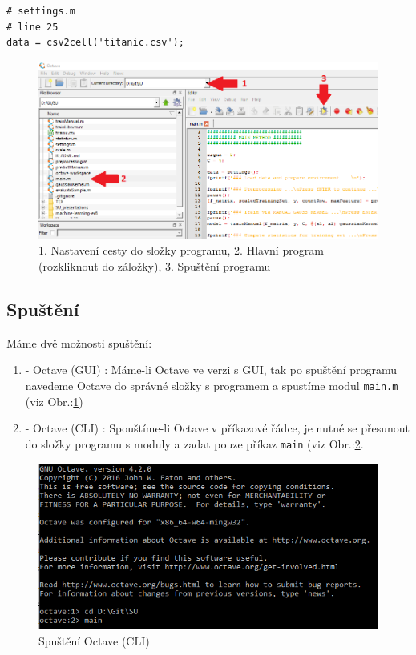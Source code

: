 \documentclass[a4]{article}
\begin{document}
\begin{lstlisting}
# settings.m
# line 25
data = csv2cell('titanic.csv');
\end{lstlisting}

\begin{figure}[!ht]
	\centering
		\includegraphics[width=\textwidth]{images/runWithGUI}
	\caption{1. Nastavení cesty do složky programu, 2. Hlavní program (rozkliknout do záložky), 3. Spuštění programu}
	\label{fig:runWithGUI}
\end{figure}

\subsection{Spuštění}
Máme dvě možnosti spuštění:

\begin{enumerate}
	\item - Octave (GUI) : Máme-li Octave ve verzi s GUI, tak po spuštění programu navedeme Octave do správné složky s programem a spustíme modul \texttt{main.m} (viz Obr.:\ref{fig:runWithGUI})
	\item - Octave (CLI) : Spouštíme-li Octave v příkazové řádce, je nutné se přesunout do složky programu s moduly a zadat pouze příkaz \texttt{main} (viz Obr.:\ref{fig:runWithoutGUI}.
\end{enumerate}

\begin{figure}[!ht]
	\centering
		\includegraphics[width=\textwidth]{images/runWithoutGUI}
	\caption{Spuštění Octave (CLI)}
	\label{fig:runWithoutGUI}
\end{figure}
\end{document}
